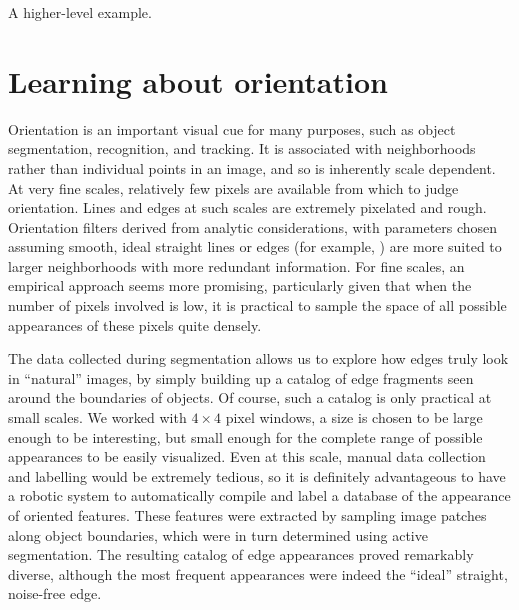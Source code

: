 A higher-level example.



\section{Learning about orientation}

Orientation is an important visual cue for many purposes, such as
object segmentation, recognition, and tracking.  It is associated with
neighborhoods rather than individual points in an image, and so is
inherently scale dependent.  At very fine scales, relatively few
pixels are available from which to judge orientation.
Lines and edges at such scales are extremely pixelated and
rough.
%
Orientation filters derived from analytic considerations, with
parameters chosen assuming smooth, ideal straight lines or edges (for
example, \cite{chen00orientation}) are more suited to larger
neighborhoods with more redundant information.
For fine scales, an empirical approach seems more promising, particularly
given that when the number of pixels involved is low, it is practical
to sample the space of all possible appearances of these pixels 
quite densely.

The data collected during segmentation allows us to explore how edges truly
look in ``natural'' images, by simply building up a catalog of edge
fragments seen around the boundaries of objects.  Of course, such a
catalog is only practical at small scales.  We worked with $4\times 4$
pixel windows, a size is chosen to be large enough to be interesting,
but small enough for the complete range of possible appearances to be
easily visualized.  Even at this scale, manual data collection and
labelling would be extremely tedious, so it is definitely advantageous
to have a robotic system to automatically compile and label a database
of the appearance of oriented features.
%
These features were extracted by sampling image patches
along object boundaries, which were in turn determined 
using active segmentation.
The resulting catalog of edge appearances proved remarkably
diverse, although the most frequent appearances were indeed
the ``ideal'' straight, noise-free edge.


